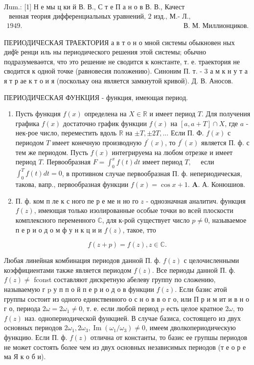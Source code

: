 \documentclass[10pt]{article}
\begin{document}
Лum.: [1] Н е мы ц ки й В. В., С т е П а н о в В. В., Качест$\begin{array}{ll}\text { венная теория дифференциальных уравнений, } 2 \text { изд., М.- Л., } \\ 1949 . & \text { В. М. Миллионциков. }\end{array}$

ПЕРИОДИЧЕСКАЯ ТРАЕКТОРИЯ а в т $о$ н $о$ мной системы обыкновен ных диф̆е ренци иль ны периодического решения этой системы; обычно подразумеваөтся, что это решение не сводится к константе, т. е. траектория не сводится к одной точке (равновесия положению). Синоним П. т. - 3 а м к н у т а я т р ае к т о и я (поскольку она является замкнутой кривой). Д. В. Аносов.

ПЕРИОДИЧЕСКАЯ ФУНКЦИЯ - функция, имеющая период.

\begin{enumerate}
  \item Пусть функция $f(x)$ определена на $X \in \mathbb{R}$ и имеет период $T$. Для получения графика $f(x)$ достаточно график функции $f(x)$ на $[a, a+T] \cap X$, где $a$ - нек-рое число, переместить вдоль $\mathbb{R}$ на $\pm T, \pm 2 T, \ldots$ Если П. Ф. $f(x)$ с периодом $T$ имеет конечную производную $f^{\prime}(x)$, то $f^{\prime}(x)$ является П. ф. с тем же периодом. Пусть $f(x)$ интегрируема на любом отрезке и имеет период $T$. Первообразная $F=\int_{0}^{x} f(t) d t$ имеет период $T, \quad$ если $\int_{0}^{T} f(t) d t=0$, в противном случае первообразная П. ф. непериодическая, такова, вапр., первообразная функции $f(x)=\cos x+1$. $\boldsymbol{A}$. $А$. Конюшиов.

  \item П. ф. ком п ле к с ного пе р е ме н но го $z$ - однозначная аналитич. функция $f(z)$, имеющая только изолированные особые точки во всей плоскости комплексного переменного $\mathbb{C}$, для к-рой существует число $p \neq 0$, называемое п е р и о д о м ф у н к ц и и $f(z)$, такое, тто

\end{enumerate}

\[
f(z+p)=f(z), z \in \mathbb{C} .
\]

Любая линейная комбинация периодов данной П. ф. $f(z)$ с целочисленными коэффициентами также является периодом $f(z)$. Все периоды данной П. ф. $f(z) \neq$ fconst составляют дискретную абелеву группу по сложению, называемую г p у п п о й п е р и о д о в функции $f(z)$. Если базис әтой группы состоит из одного единственного о с н о в в о г о, или П р и м ит и в н о г о, периода $2 \omega=2 \omega_{1} \neq 0$, т. е. если любой период $p$ есть целое кратное $2 \omega$, то $f(z)$ наз. однопериодической функцией. В случае базиса, состоящего из двух основных периодов $2 \omega_{1}, 2 \omega_{3}, \operatorname{Im}\left(\omega_{1} / \omega_{3}\right) \neq 0$, имеем дволкопериодическую функцию. Если П. ф. $f(z)$ отлична от константы, то базис ее групшы периодов не может состоять более чем из двух основных независимых периодов (т е о р е ма Я к о б и).
\end{document}
